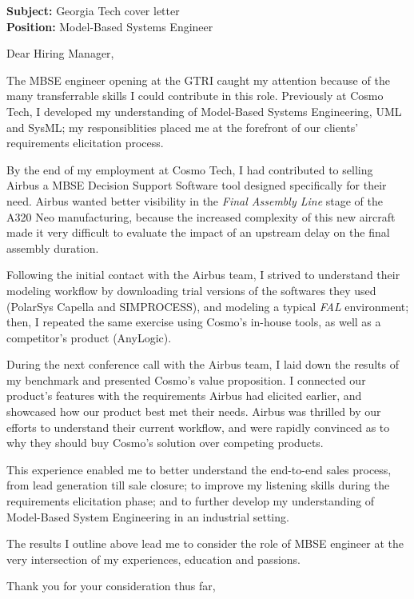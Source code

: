 \documentclass{letter}
\begin{document}
\begin{letter}{
\textbf{Subject:} Georgia Tech cover letter\\
\textbf{Position:} Model-Based Systems Engineer\\
}

\opening{Dear Hiring Manager,}

The MBSE engineer opening at the GTRI caught my attention because of the many transferrable skills I could contribute in this role.
Previously at Cosmo Tech, I developed my understanding of Model-Based Systems Engineering, UML and SysML; my responsiblities placed me at the forefront of our clients' requirements elicitation process. 

By the end of my employment at Cosmo Tech, I had contributed to selling Airbus a MBSE Decision Support Software tool designed specifically for their need.
Airbus wanted better visibility in the \textit{Final Assembly Line} stage of the A320 Neo manufacturing, because the increased complexity of this new aircraft made it very difficult to evaluate the impact of an upstream delay on the final assembly duration.

Following the initial contact with the Airbus team, I strived to understand their modeling workflow by downloading trial versions of the softwares they used (PolarSys Capella and SIMPROCESS), and modeling a typical \textit{FAL} environment;
then, I repeated the same exercise using Cosmo's in-house tools, as well as a competitor's product (AnyLogic).

During the next conference call with the Airbus team, I laid down the results of my benchmark and presented Cosmo's value proposition.
I connected our product's features with the requirements Airbus had elicited earlier, and showcased how our product best met their needs.
Airbus was thrilled by our efforts to understand their current workflow, and were rapidly convinced as to why they should buy Cosmo's solution over competing products.

This experience enabled me to better understand the end-to-end sales process, from lead generation till sale closure;
to improve my listening skills during the requirements elicitation phase;
and to further develop my understanding of Model-Based System Engineering in an industrial setting. 

The results I outline above lead me to consider the role of MBSE engineer at the very intersection of my experiences, education and passions.

\closing{Thank you for your consideration thus far,}

\end{letter}
\end{document}
